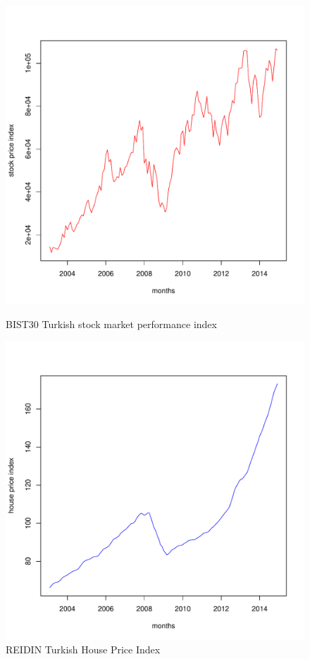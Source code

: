 \begin{figure}
	\centering
    \begin{minipage}{0.45\textwidth}
		\centering
		\includegraphics[scale=0.4]{figs/bist.pdf}
		\caption{BIST30 Turkish stock market performance index}
	\end{minipage}
	\hfill
    \begin{minipage}{0.45\textwidth}
		\centering
		\includegraphics[scale=0.4]{figs/reidin.pdf}
		\caption{REIDIN Turkish House Price Index}
	\end{minipage}
\end{figure}


